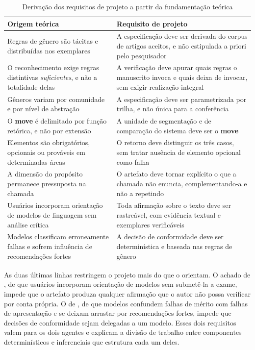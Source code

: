 \begin{table}[H]
\centering
\caption{Derivação dos requisitos de projeto a partir da fundamentação teórica}
\label{tab:requisitos}
\small
\begin{tabular}{|p{6.4cm}|p{7.4cm}|}
\hline
\textbf{Origem teórica} & \textbf{Requisito de projeto} \\
\hline
Regras de gênero são tácitas e distribuídas nos exemplares \cite{GenresOrgComm} & A especificação deve ser derivada do corpus de artigos aceitos, e não estipulada a priori pelo pesquisador \\
\hline
O reconhecimento exige regras distintivas \textit{suficientes}, e não a totalidade delas \cite{GenresOrgComm} & A verificação deve apurar quais regras o manuscrito invoca e quais deixa de invocar, sem exigir realização integral \\
\hline
Gêneros variam por comunidade e por nível de abstração \cite{GenreRepertoire} & A especificação deve ser parametrizada por trilha, e não única para a conferência \\
\hline
O \textbf{move} é delimitado por função retórica, e não por extensão \cite{GenreAnalysis} & A unidade de segmentação e de comparação do sistema deve ser o \textbf{move} \\
\hline
Elementos são obrigatórios, opcionais ou prováveis em determinadas áreas \cite{ResearchGenres} & O retorno deve distinguir os três casos, sem tratar ausência de elemento opcional como falha \\
\hline
A dimensão do propósito permanece pressuposta na chamada \cite{GenreSystems} & O artefato deve tornar explícito o que a chamada não enuncia, complementando-a e não a repetindo \\
\hline
Usuários incorporam orientação de modelos de linguagem sem análise crítica \cite{WhyandWhen} & Toda afirmação sobre o texto deve ser rastreável, com evidência textual e exemplares verificáveis \\
\hline
Modelos classificam erroneamente falhas e sofrem influência de recomendações fortes \cite{WhereLLMWrong} & A decisão de conformidade deve ser determinística e baseada nas regras de gênero \\
\hline
\end{tabular}
\end{table}

As duas últimas linhas restringem o projeto mais do que o orientam. O achado de , de que usuários incorporam orientação de modelos sem submetê-la a exame, impede que o artefato produza qualquer afirmação que o autor não possa verificar por conta própria. O de , de que modelos confundem falhas de mérito com falhas de apresentação e se deixam arrastar por recomendações fortes, impede que decisões de conformidade sejam delegadas a um modelo. Esses dois requisitos valem para os dois agentes e explicam a divisão de trabalho entre componentes determinísticos e inferenciais que estrutura cada um deles.


